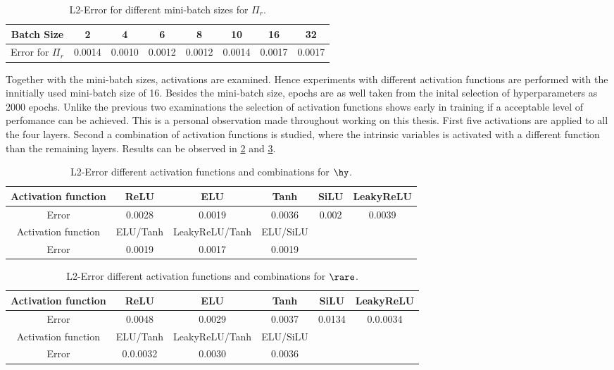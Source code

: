 \begin{table}[!htbp]\centering
	\begin{tabular}{ |c|c|c|c|c|c|c|c| }
		\hline
		Batch Size & 2 & 4 & 6 & 8 & 10 & 16 & 32 \\ [.5ex]
		\hline
		Error for \(\Pi_r\)& 0.0014 & 0.0010 & 0.0012 & 0.0012 & 0.0014 & 0.0017 & 0.0017\\ \hline
	\end{tabular}
	\caption{L2-Error for different mini-batch sizes for \(\Pi_r\).}
	\label{Tab:Batch Size Rare}
\end{table}
Together with the mini-batch sizes, activations are examined. Hence experiments with different activation functions are performed with the innitially used mini-batch size of 16. Besides the mini-batch size, epochs are as well taken from the inital selection of hyperparameters as 2000 epochs. Unlike the previous two examinations the selection of activation functions shows early in training if a acceptable level of perfomance can be achieved. This is a personal observation made throughout working on this thesis. First five activations are applied to all the four layers. Second a combination of activation functions is studied, where the intrinsic variables is activated with a different function than the remaining layers. Results can be observed in \cref{Tab:Activations Hydro} and \cref{Tab:Activations Rare}.
\begin{table}[!htbp]\centering
	\begin{tabular}{ |c|c|c|c|c|c| }
		\hline
		Activation function & ReLU & ELU & Tanh & SiLU & LeakyReLU \\ [.5ex]
		\hline
		Error & 0.0028 & 0.0019 & 0.0036 & 0.002 & 0.0039\\ \hline
		Activation function & ELU/Tanh & LeakyReLU/Tanh & ELU/SiLU & & \\ [.5ex]
		\hline
		Error & 0.0019 & 0.0017 & 0.0019 &  & \\ \hline
	\end{tabular}
	\caption{L2-Error different activation functions and combinations for $\hy$.}
	\label{Tab:Activations Hydro}
\end{table}
\begin{table}[!htbp]\centering
	\begin{tabular}{ |c|c|c|c|c|c| }
		\hline
		Activation function & ReLU & ELU & Tanh & SiLU & LeakyReLU \\ [.5ex]
		\hline
		Error & 0.0048 & 0.0029 & 0.0037 & 0.0134 & 0.0.0034\\ \hline
		Activation function & ELU/Tanh & LeakyReLU/Tanh & ELU/SiLU & & \\ [.5ex]
		\hline
		Error & 0.0.0032 & 0.0030 & 0.0036 &  & \\ \hline
	\end{tabular}
	\caption{L2-Error different activation functions and combinations for $\rare$.}
	\label{Tab:Activations Rare} 
\end{table}
